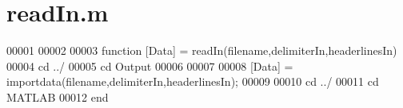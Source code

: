 \hypertarget{read_in_8m_source}{}\section{read\+In.\+m}
\label{read_in_8m_source}

\begin{DoxyCode}
00001 %
00002 
00003 \textcolor{keyword}{function} [Data] = readIn(filename,delimiterIn,headerlinesIn)
00004 cd ../
00005 cd Output
00006 %
00007 %
00008 [Data] = importdata(filename,delimiterIn,headerlinesIn);
00009 
00010 cd ../
00011 cd MATLAB
00012 end
\end{DoxyCode}
